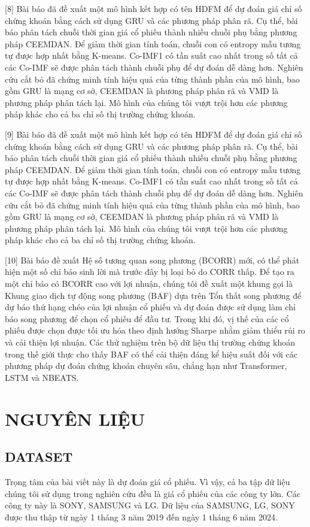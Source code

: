 \documentclass[conference]{IEEEtran}
\begin{document}
[8] Bài báo đã đề xuất một mô hình kết hợp có tên HDFM để dự đoán giá chỉ số chứng khoán bằng cách sử dụng GRU và các phương pháp phân rã. Cụ thể, bài báo phân tách chuỗi thời gian giá cổ phiếu thành nhiều chuỗi phụ bằng phương pháp CEEMDAN. Để giảm thời gian tính toán, chuỗi con có entropy mẫu tương tự được hợp nhất bằng K-means. Co-IMF1 có tần suất cao nhất trong số tất cả các Co-IMF sẽ được phân tách thành chuỗi phụ để dự đoán dễ dàng hơn. Nghiên cứu cắt bỏ đã chứng minh tính hiệu quả của từng thành phần của mô hình, bao gồm GRU là mạng cơ sở, CEEMDAN là phương pháp phân rã và VMD là phương pháp phân tách lại. Mô hình của chúng tôi vượt trội hơn các phương pháp khác cho cả ba chỉ số thị trường chứng khoán.

[9] Bài báo đã đề xuất một mô hình kết hợp có tên HDFM để dự đoán giá chỉ số chứng khoán bằng cách sử dụng GRU và các phương pháp phân rã. Cụ thể, bài báo phân tách chuỗi thời gian giá cổ phiếu thành nhiều chuỗi phụ bằng phương pháp CEEMDAN. Để giảm thời gian tính toán, chuỗi con có entropy mẫu tương tự được hợp nhất bằng K-means. Co-IMF1 có tần suất cao nhất trong số tất cả các Co-IMF sẽ được phân tách thành chuỗi phụ để dự đoán dễ dàng hơn. Nghiên cứu cắt bỏ đã chứng minh tính hiệu quả của từng thành phần của mô hình, bao gồm GRU là mạng cơ sở, CEEMDAN là phương pháp phân rã và VMD là phương pháp phân tách lại. Mô hình của chúng tôi vượt trội hơn các phương pháp khác cho cả ba chỉ số thị trường chứng khoán.

[10] Bài báo đề xuất Hệ số tương quan song phương (BCORR) mới, có thể phát hiện một số chỉ báo sinh lời mà trước đây bị loại bỏ do CORR thấp. Để tạo ra một chỉ báo có BCORR cao với lợi nhuận, chúng tôi đề xuất một khung gọi là Khung giao dịch tự động song phương (BAF) dựa trên Tổn thất song phương để dự báo thứ hạng chéo của lợi nhuận cổ phiếu và dự đoán được sử dụng làm chỉ báo song phương để chọn cổ phiếu để đầu tư. Trong khi đó, vị thế của các cổ phiếu được chọn được tối ưu hóa theo định hướng Sharpe nhằm giảm thiểu rủi ro và cải thiện lợi nhuận. Các thử nghiệm trên bộ dữ liệu thị trường chứng khoán trong thế giới thực cho thấy BAF có thể cải thiện đáng kể hiệu suất đối với các phương pháp dự đoán chứng khoán chuyên sâu, chẳng hạn như Transformer, LSTM và NBEATS. 


\section{NGUYÊN LIỆU}

\subsection{DATASET}
Trọng tâm của bài viết này là dự đoán giá cổ phiếu. Vì vậy, cả ba tập dữ liệu chúng tôi sử dụng trong nghiên cứu đều là giá cổ phiếu của các công ty lớn. Các công ty này là SONY, SAMSUNG và LG. Dữ liệu của SAMSUNG, LG, SONY được thu thập từ ngày 1 tháng 3 năm 2019 đến ngày 1 tháng 6 năm 2024.  
\end{document}
